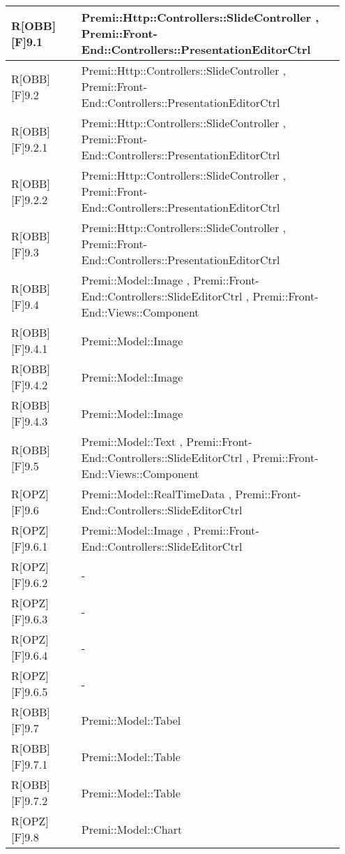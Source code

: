 \newpage
\begin{table}[h]
	\begin{center}
		\begin{tabular}{|p{0.2\linewidth}|p{0.75\linewidth}|}
			\toprule
			R[OBB][F]9.1 & Premi::Http::Controllers::SlideController , Premi::Front-End::Controllers::PresentationEditorCtrl\\
		\midrule
			R[OBB][F]9.2 & Premi::Http::Controllers::SlideController , Premi::Front-End::Controllers::PresentationEditorCtrl\\
		\midrule
			R[OBB][F]9.2.1 & Premi::Http::Controllers::SlideController , Premi::Front-End::Controllers::PresentationEditorCtrl\\
		\midrule
			R[OBB][F]9.2.2 & Premi::Http::Controllers::SlideController , Premi::Front-End::Controllers::PresentationEditorCtrl\\
		\midrule
			R[OBB][F]9.3 & Premi::Http::Controllers::SlideController , Premi::Front-End::Controllers::PresentationEditorCtrl\\
		\midrule
			R[OBB][F]9.4 & Premi::Model::Image , Premi::Front-End::Controllers::SlideEditorCtrl , Premi::Front-End::Views::Component\\
		\midrule
			R[OBB][F]9.4.1 & Premi::Model::Image\\
		\midrule
			R[OBB][F]9.4.2 & Premi::Model::Image\\
		\midrule
			R[OBB][F]9.4.3 & Premi::Model::Image\\
		\midrule
			R[OBB][F]9.5 & Premi::Model::Text , Premi::Front-End::Controllers::SlideEditorCtrl , Premi::Front-End::Views::Component\\
		\midrule
			R[OPZ][F]9.6 & Premi::Model::RealTimeData , Premi::Front-End::Controllers::SlideEditorCtrl\\
		\midrule
			R[OPZ][F]9.6.1 & Premi::Model::Image , Premi::Front-End::Controllers::SlideEditorCtrl\\
		\midrule
			R[OPZ][F]9.6.2 & -\\
		\midrule
			R[OPZ][F]9.6.3 & -\\
		\midrule
			R[OPZ][F]9.6.4 & -\\
		\midrule
			R[OPZ][F]9.6.5 & -\\
		\midrule
			R[OBB][F]9.7 & Premi::Model::Tabel\\
		\midrule
			R[OBB][F]9.7.1 & Premi::Model::Table\\
		\midrule
			R[OBB][F]9.7.2 & Premi::Model::Table\\
		\midrule
			R[OPZ][F]9.8 & Premi::Model::Chart\\

\end{tabular}
\end{center}
\end{table}
